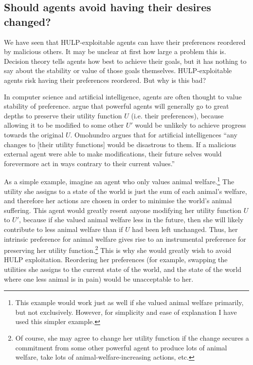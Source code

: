 \documentclass{article}
\begin{document}
\subsection{Should agents avoid having their desires changed?}

We have seen that HULP-exploitable agents can have their preferences reordered by malicious others. It may be unclear at first how large a problem this is. Decision theory tells agents how best to achieve their goals, but it has nothing to say about the stability or value of those goals themselves. HULP-exploitable agents risk having their preferences reordered. But why is this bad?

In computer science and artificial intelligence, agents are often thought to value stability of preference. \citet{omohundro2008basic,bostrom2012will} argue that powerful agents will generally go to great depths to preserve their utility function \(U\) (i.e. their preferences), because allowing it to be modified to some other \(U'\) would be unlikely to achieve progress towards the original \(U\). Omohundro argues that for artificial intelligences ``any changes to [their utility functions] would be disastrous to them. If a malicious external agent were able to make modifications, their future selves would forevermore act in ways contrary to their current values.''

As a simple example, imagine an agent who only values animal welfare.\footnote{This example would work just as well if she valued animal welfare primarily, but not exclusively. However, for simplicity and ease of explanation I have used this simpler example.} The utility she assigns to a state of the world is just the sum of each animal's welfare, and therefore her actions are chosen in order to minimise the world's animal suffering. This agent would greatly resent anyone modifying her utility function \(U\) to \(U'\), because if she valued animal welfare less in the future, then she will likely contribute to less animal welfare than if \(U\) had been left unchanged. Thus, her intrinsic preference for animal welfare gives rise to an instrumental preference for preserving her utility function.\footnote{Of course, she may agree to change her utility function if the change secures a commitment from some other powerful agent to produce lots of animal welfare, take lots of animal-welfare-increasing actions, etc.} This is why she would greatly wish to avoid HULP exploitation. Reordering her preferences (for example, swapping the utilities she assigns to the current state of the world, and the state of the world where one less animal is in pain) would be unacceptable to her.
\end{document}
